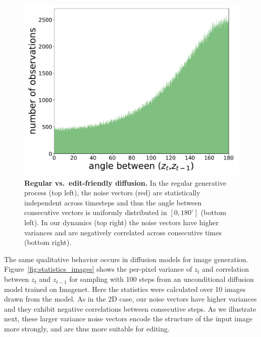 \begin{figure}
\begin{center}
\includegraphics[width=0.49\columnwidth, trim={0cm 0cm 0cm 0.5cm},clip]{ICCV23_submission/figures/z_hist_ours.pdf}
\end{center}
\caption{\textbf{Regular vs.~edit-friendly diffusion.} In the regular generative process (top left), the noise vectors (red) are statistically independent across timesteps and thus the angle between consecutive vectors is uniformly distributed in $[0,180^\circ]$ (bottom left). In our dynamics (top right) the noise vectors have higher variances and are negatively correlated across consecutive times (bottom right).}
\label{fig:statistics_2d}
\end{figure}


The same qualitative behavior occurs in diffusion models for image generation. Figure~\ref{fig:statistics_images} shows the per-pixel variance of $z_t$ and correlation between $z_t$ and $z_{t-1}$ for sampling with 100 steps from an unconditional diffusion model trained on Imagenet. Here the statistics were calculated over 10 images drawn from the model. As in the 2D case, our noise vectors have higher variances and they exhibit negative correlations between consecutive steps. As we illustrate next, these larger variance noise vectors encode the structure of the input image more strongly, and are thus more suitable for editing. 



